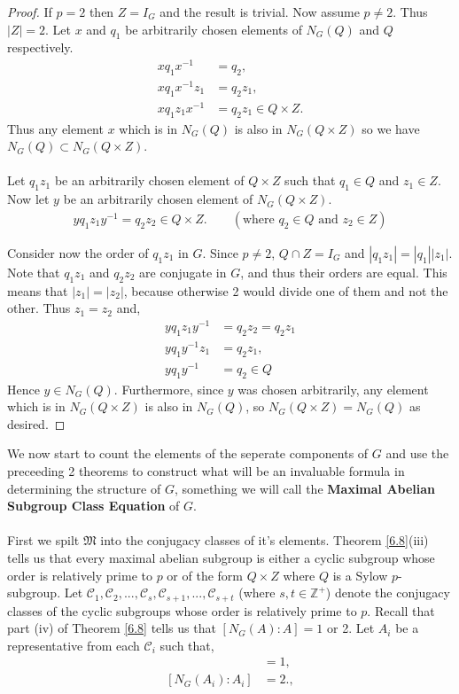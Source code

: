 \begin{proof} 

If $p= 2$ then $Z = I_G$ and the result is trivial. Now assume $p \neq 2$. Thus $|Z| = 2$. Let $x$ and $q_1$ be arbitrarily chosen elements of $N_G(Q)$ and $Q$ respectively.
\begin{align*} xq_1x^{-1} &= q_2, \tag{for some $q_2 \in Q$}
\\ xq_1x^{-1}z_1 &= q_2z_1,
\\ xq_1z_1x^{-1} &= q_2z_1 \in Q \times Z.
\end{align*}
Thus any element $x$ which is in $N_G(Q)$ is also in $N_G(Q \times Z)$ so we have $N_G(Q) \subset N_G(Q \times Z)$. \\
\\
Let $q_1 z_1$ be an arbitrarily chosen element of $Q \times Z$ such that $q_1 \in Q$ and $z_1 \in Z$. Now let $y$ be an arbitrarily chosen element of $N_G(Q \times Z)$.
\begin{align*} y q_1 z_1 y^{-1} = q_2 z_2 \in Q \times Z. \qquad (\text{where $q_2 \in Q$ and $z_2 \in Z$}) 
\end{align*}

Consider now the order of $q_1z_1$ in $G$. Since $p \neq 2$, $Q \cap Z = I_G$ and $|q_1 z_1| = |q_1| |z_1|$. Note that $q_1 z_1$ and $q_2 z_2$ are conjugate in $G$, and thus their orders are equal. This means that $|z_1| = |z_2|$, because otherwise 2 would divide one of them and not the other. Thus $z_1 = z_2$ and,
\begin{align*} y q_1z_1 y^{-1} &=  q_2z_2 = q_2z_1
\\ y q_1 y^{-1} z_1 &= q_2z_1,
\\ y q_1 y^{-1} &= q_2 \in Q
\end{align*}
Hence $y \in N_G(Q)$. Furthermore, since $y$ was chosen arbitrarily, any element which is in $N_G(Q \times Z)$ is also in $N_G(Q)$, so $N_G(Q \times Z) = N_G(Q)$ as desired.

\end{proof}

We now start to count the elements of the seperate components of $G$ and use the preceeding 2 theorems to construct what will be an invaluable formula in determining the structure of $G$, something we will call the \textbf{Maximal Abelian Subgroup Class Equation} of $G$. \\
\\
First we spilt $\mathfrak{M}$ into the conjugacy classes of it's elements. Theorem \ref{6.8}(iii) tells us that every maximal abelian subgroup is either a cyclic subgroup whose order is relatively prime to $p$ or of the form $Q \times Z$ where $Q$ is a Sylow $p$-subgroup. Let $\mathcal{C}_1, \mathcal{C}_2,...,\mathcal{C}_s, \mathcal{C}_{s+1},..., \mathcal{C}_{s+t}$ (where $s, t \in \mathbb{Z}^+$) denote the conjugacy classes of the cyclic subgroups whose order is relatively prime to $p$. Recall that part (iv) of Theorem \ref{6.8} tells us that $[N_G(A): A] = 1$ or 2. Let $A_i$ be a representative from each $\mathcal{C}_i$ such that,
\begin{align*} [N_G(A_i) : A_i] &= 1, \tag{for  $i \leq s$} \\[2mm]
[N_G(A_i) : A_i] &= 2. \tag{for  $s < i \leq s+t$}, \end{align*}

